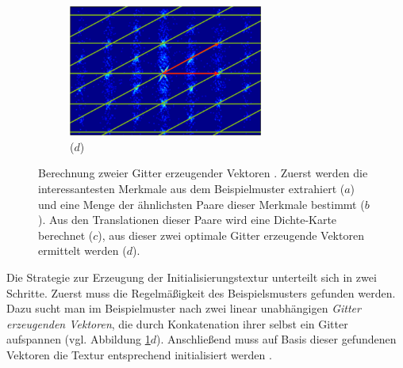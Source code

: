 \begin{figure}
	\hfill
	\begin{subfigure}{0.45\textwidth}
		\centering
		\includegraphics[width=0.7\textwidth]{images/regular-4}
		\caption*{($d$)}
	\end{subfigure}
	
	\caption{
		Berechnung zweier Gitter erzeugender Vektoren \cite{SelfTuning}.
		Zuerst werden die interessantesten Merkmale aus dem Beispielmuster extrahiert ($a$) und eine Menge der ähnlichsten Paare dieser Merkmale bestimmt ($b$).
		Aus den Translationen dieser Paare wird eine Dichte-Karte berechnet ($c$), aus dieser zwei optimale Gitter erzeugende Vektoren ermittelt werden ($d$).
	}
	\label{regular}
\end{figure}

Die Strategie zur Erzeugung der Initialisierungstextur unterteilt sich in zwei Schritte.
Zuerst muss die Regelmäßigkeit des Beispielsmusters gefunden werden.
Dazu sucht man im Beispielmuster nach zwei linear unabhängigen \emph{Gitter erzeugenden Vektoren}, die durch Konkatenation ihrer selbst ein Gitter aufspannen (vgl. Abbildung \ref{regular}$d$).
Anschließend muss auf Basis dieser gefundenen Vektoren die Textur entsprechend initialisiert werden \cite{SelfTuning}.

